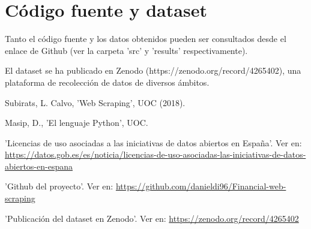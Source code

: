 \documentclass[12pt]{article}
\begin{document}
\section*{Código fuente y dataset}
Tanto el código fuente y los datos obtenidos pueden ser consultados desde el enlace de Github (ver la carpeta 'src' y 'results' respectivamente).

El dataset se ha publicado en Zenodo (https://zenodo.org/record/4265402), una plataforma de recolección de datos de diversos ámbitos.


\clearpage
\begin{thebibliography}{9}
	Subirats, L. Calvo, 'Web Scraping', UOC (2018).
	
	Masip, D., 'El lenguaje Python', UOC.
	
	'Licencias de uso asociadas a las iniciativas de datos abiertos en España'. Ver en: \url{https://datos.gob.es/es/noticia/licencias-de-uso-asociadas-las-iniciativas-de-datos-abiertos-en-espana}
	
	'Github del proyecto'. Ver en: \url{https://github.com/danieldi96/Financial-web-scraping}
	
	'Publicación del dataset en Zenodo'. Ver en: \url{https://zenodo.org/record/4265402}

	
	
\end{thebibliography}
\end{document}
